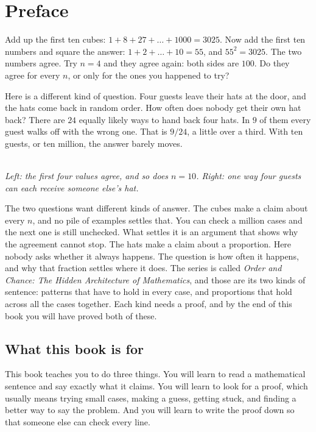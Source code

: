 \chapter*{Preface}
Add up the first ten cubes: $1+8+27+\dots+1000=3025$. Now add the first ten numbers and square the answer: $1+2+\dots+10=55$, and $55^2=3025$. The two numbers agree. Try $n=4$ and they agree again: both sides are $100$. Do they agree for every $n$, or only for the ones you happened to try?

Here is a different kind of question. Four guests leave their hats at the door, and the hats come back in random order. How often does nobody get their own hat back? There are $24$ equally likely ways to hand back four hats. In $9$ of them every guest walks off with the wrong one. That is $9/24$, a little over a third. With ten guests, or ten million, the answer barely moves.

\begin{center}
\\[0.35em]
{\small\itshape Left: the first four values agree, and so does $n=10$. Right: one way four guests can each receive someone else's hat.}
\end{center}

The two questions want different kinds of answer. The cubes make a claim about every $n$, and no pile of examples settles that. You can check a million cases and the next one is still unchecked. What settles it is an argument that shows why the agreement cannot stop. The hats make a claim about a proportion. Here nobody asks whether it always happens. The question is how often it happens, and why that fraction settles where it does. The series is called \emph{Order and Chance: The Hidden Architecture of Mathematics}, and those are its two kinds of sentence: patterns that have to hold in every case, and proportions that hold across all the cases together. Each kind needs a proof, and by the end of this book you will have proved both of these.

\section*{What this book is for}
This book teaches you to do three things. You will learn to read a mathematical sentence and say exactly what it claims. You will learn to look for a proof, which usually means trying small cases, making a guess, getting stuck, and finding a better way to say the problem. And you will learn to write the proof down so that someone else can check every line.

